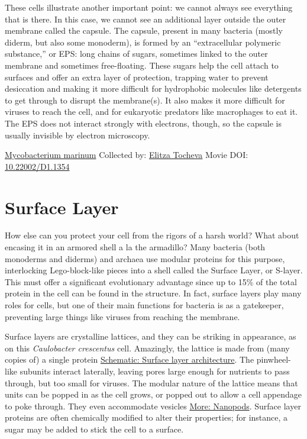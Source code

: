 \documentclass[]{tufte-book}
\begin{document}
These cells illustrate another important point: we cannot always see everything that is there. In this case, we cannot see an additional layer outside the outer membrane called the capsule. The capsule, present in many bacteria (mostly diderm, but also some monoderm), is formed by an ``extracellular polymeric substance,'' or EPS: long chains of sugars, sometimes linked to the outer membrane and sometimes free-floating. These sugars help the cell attach to surfaces and offer an extra layer of protection, trapping water to prevent desiccation and making it more difficult for hydrophobic molecules like detergents to get through to disrupt the membrane(s). It also makes it more difficult for viruses to reach the cell, and for eukaryotic predators like macrophages to eat it. The EPS does not interact strongly with electrons, though, so the capsule is usually invisible by electron microscopy.



\hypertarget{htmlwidget-e39e44f8f3e2b86f28af}{}

\label{fig:2-5}\protect\hyperlink{tree}{Mycobacterium marinum} Collected by: \protect\hyperlink{elitza_tocheva}{Elitza Tocheva} Movie DOI: \href{https://doi.org/10.22002/D1.1354}{10.22002/D1.1354}

\hypertarget{surface-layer}{%
\section{Surface Layer}\label{surface-layer}}

How else can you protect your cell from the rigors of a harsh world? What about encasing it in an armored shell a la the armadillo? Many bacteria (both monoderms and diderms) and archaea use modular proteins for this purpose, interlocking Lego-block-like pieces into a shell called the Surface Layer, or S-layer. This must offer a significant evolutionary advantage since up to 15\% of the total protein in the cell can be found in the structure. In fact, surface layers play many roles for cells, but one of their main functions for bacteria is as a gatekeeper, preventing large things like viruses from reaching the membrane.

Surface layers are crystalline lattices, and they can be striking in appearance, as on this \emph{Caulobacter crescentus} cell. Amazingly, the lattice is made from (many copies of) a single protein \protect\hyperlink{Surface_layer_architecture}{Schematic: Surface layer architecture}. The pinwheel-like subunits interact laterally, leaving pores large enough for nutrients to pass through, but too small for viruses. The modular nature of the lattice means that units can be popped in as the cell grows, or popped out to allow a cell appendage to poke through. They even accommodate vesicles \protect\hyperlink{Nanopods}{More: Nanopods}. Surface layer proteins are often chemically modified to alter their properties; for instance, a sugar may be added to stick the cell to a surface.
\end{document}
